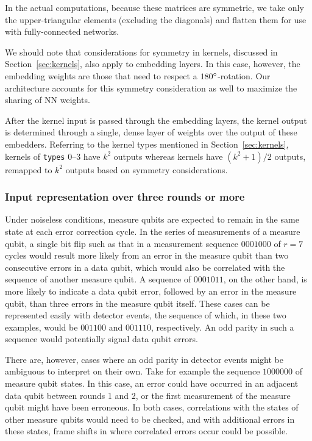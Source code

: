 In the actual computations, because these matrices are symmetric, we take only the upper-triangular elements (excluding the diagonals) and flatten them for use with fully-connected networks.

We should note that considerations for symmetry in  kernels, discussed in Section~\ref{sec:kernels}, also apply to embedding layers. In this case, however, the embedding weights are those that need to respect a $180^\circ$-rotation. Our architecture accounts for this symmetry consideration as well to maximize the sharing of NN weights.

After the kernel input is passed through the embedding layers, the kernel output is determined through a single, dense layer of weights over the output of these embedders. Referring to the kernel types mentioned in Section~\ref{sec:kernels}, kernels of \texttt{types} 0--3 have $k^2$ outputs whereas  kernels have $(k^2+1)/2$ outputs, remapped to $k^2$ outputs based on symmetry considerations.


\subsubsection{Input representation over three rounds or more}
\label{sec:kernels-r3}

Under noiseless conditions, measure qubits are expected to remain in the same state at each error correction cycle.
In the series of measurements of a measure qubit, a single bit flip such as that in a measurement sequence $0001000$ of $r=7$ cycles would result more likely from an error in the measure qubit than two consecutive errors in a data qubit, which would also be correlated with the sequence of another measure qubit.
A sequence of $0001011$, on the other hand, is more likely to indicate a data qubit error, followed by an error in the measure qubit, than three errors in the measure qubit itself.
These cases can be represented easily with  detector events, the sequence of which, in these two examples, would be $001100$ and $001110$, respectively. An odd parity in such a sequence would potentially signal data qubit errors.

There are, however, cases where an odd parity in detector events might be ambiguous to interpret on their own. Take for example the sequence $1000000$ of measure qubit states. In this case, an error could have occurred in an adjacent data qubit between rounds 1 and 2, or the first measurement of the measure qubit might have been erroneous. In both cases, correlations with the states of other measure qubits would need to be checked, and with additional errors in these states, frame shifts in where correlated errors occur could be possible.

